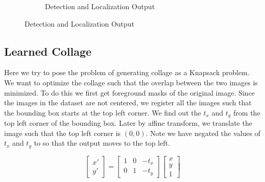 \documentclass{article}
\begin{document}
\begin{figure}[h!]
\begin{subfigure}{0.3\linewidth}
    \caption{Detection and Localization Output}
    \end{subfigure}
    \label{fig:random_collage}
\end{figure}


\subsection{Learned Collage}
\label{sec:GeneratingCollage}
Here we try to pose the problem of generating collage as a Knapsack problem. We want to optimize the collage such that the overlap between the two images is minimized. To do this we first get foreground masks of the original image. Since the images in the dataset are not centered, we register all the images such that the bounding box starts at the top left corner. We find out the $t_{x}$ and $t_{y}$  from the top left corner of the bounding box. Later by affine transform, we translate the image such that the top left corner is $(0,0)$. Note we have negated the values of  $t_{x}$ and $t_{y}$  to so that the output moves to the top left.

\begin{equation}
\begin{bmatrix}
x'\\
y'
\end{bmatrix}
= 
\begin{bmatrix}
1 & 0 & -t_{x}\\
0 & 1 & -t_{y}
\end{bmatrix}
\begin{bmatrix}
x\\
y\\
1
\end{bmatrix}
\end{equation}
\end{document}
